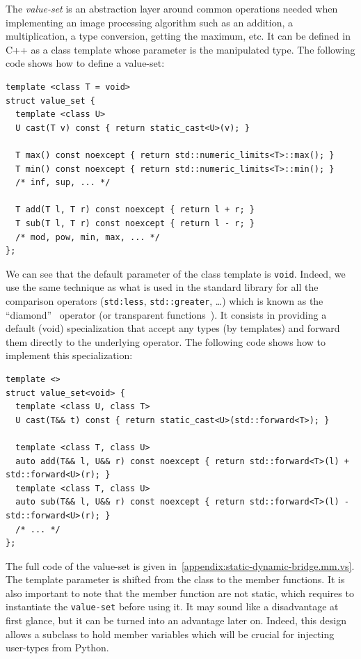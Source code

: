 The \emph{value-set} is an abstraction layer around common operations needed when implementing an image processing
algorithm such as an addition, a multiplication, a type conversion, getting the maximum, etc. It can be defined in C++
as a class template whose parameter is the manipulated type. The following code shows how to define a value-set:
\begin{verbatim}
template <class T = void>
struct value_set {
  template <class U>
  U cast(T v) const { return static_cast<U>(v); }

  T max() const noexcept { return std::numeric_limits<T>::max(); }
  T min() const noexcept { return std::numeric_limits<T>::min(); }
  /* inf, sup, ... */

  T add(T l, T r) const noexcept { return l + r; }
  T sub(T l, T r) const noexcept { return l - r; }
  /* mod, pow, min, max, ... */
};
\end{verbatim}
We can see that the default parameter of the class template is \texttt{void}. Indeed, we use the same technique as what
is used in the standard library for all the comparison operators (\texttt{std:less}, \texttt{std::greater}, \ldots)
which is known as the ``diamond''~\parencite{lavavej.2012.transparent,munoz.2012.comparison} operator (or transparent
functions~\parencite{wakely.2013.transparent,horvath.2016.transparent}). It consists in providing a default (void)
specialization that accept any types (by templates) and forward them directly to the underlying operator. The following
code shows how to implement this specialization:
\begin{verbatim}
template <>
struct value_set<void> {
  template <class U, class T>
  U cast(T&& t) const { return static_cast<U>(std::forward<T>); }

  template <class T, class U>
  auto add(T&& l, U&& r) const noexcept { return std::forward<T>(l) + std::forward<U>(r); }
  template <class T, class U>
  auto sub(T&& l, U&& r) const noexcept { return std::forward<T>(l) - std::forward<U>(r); }
  /* ... */
};
\end{verbatim}
The full code of the value-set is given in~\cref{appendix:static-dynamic-bridge.mm.vs}. The template parameter is
shifted from the class to the member functions. It is also important to note that the member function are not static,
which requires to instantiate the \texttt{value-set} before using it. It may sound like a disadvantage at first glance,
but it can be turned into an advantage later on. Indeed, this design allows a subclass to hold member variables which
will be crucial for injecting user-types from Python.

